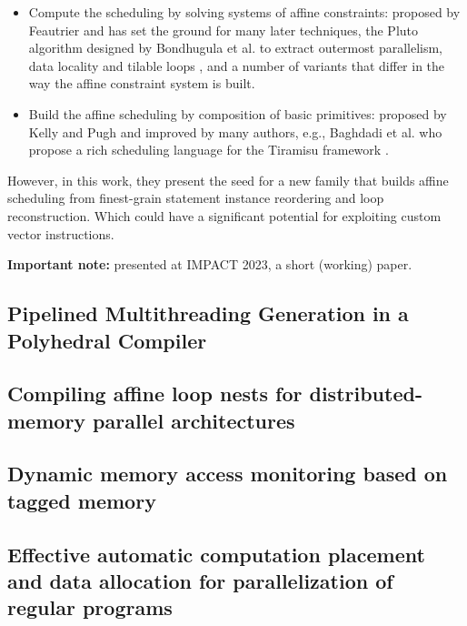 \documentclass[a4paper, 11pt]{article}
\begin{document}
\begin{itemize}
    \item Compute the scheduling by solving systems of affine constraints: proposed by Feautrier \cite{feautrier1992some} and has set the ground for many later techniques, the Pluto algorithm designed by Bondhugula et al. to extract outermost parallelism, data locality and tilable loops \cite{bondhugula2008practical}, and a number of variants that differ in the way the affine constraint system is built.
    \item Build the affine scheduling by composition of basic primitives: proposed by Kelly and Pugh \cite{kelly1998framework} and improved by many authors, e.g., Baghdadi et al. who propose a rich scheduling language for the Tiramisu framework \cite{baghdadi2019tiramisu}. 
\end{itemize}
However, in this work, they present the seed for a new family that builds affine scheduling from finest-grain statement instance reordering and loop reconstruction. Which could have a significant potential for exploiting custom vector instructions.

\textbf{Important note:} presented at IMPACT 2023, a short (working) paper.

\subsection{Pipelined Multithreading Generation in a Polyhedral Compiler}

\subsection{Compiling affine loop nests for distributed-memory parallel architectures}
\cite{bondhugulaCompilingAffineLoop2013}

\subsection{Dynamic memory access monitoring based on tagged memory}
\cite{dathathriDynamicMemoryAccess2013}

\subsection{Effective automatic computation placement and data allocation for parallelization of regular programs}
\cite{reddyEffectiveAutomaticComputation2014}

\cleardoublepage



\end{document}
